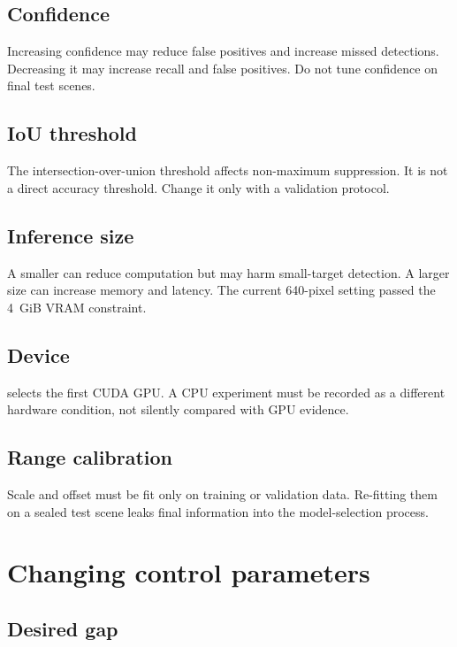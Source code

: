 \documentclass[11pt,oneside,openany]{book}
\newcommand{\file}[1]{\path{#1}}
\begin{document}
\section{Confidence}

Increasing confidence may reduce false positives and increase missed detections. Decreasing it may increase recall and false positives. Do not tune confidence on final test scenes.

\section{IoU threshold}

The intersection-over-union threshold affects non-maximum suppression. It is not a direct accuracy threshold. Change it only with a validation protocol.

\section{Inference size}

A smaller \file{image_size} can reduce computation but may harm small-target detection. A larger size can increase memory and latency. The current 640-pixel setting passed the 4~GiB VRAM constraint.

\section{Device}

\file{device: "0"} selects the first CUDA GPU. A CPU experiment must be recorded as a different hardware condition, not silently compared with GPU evidence.

\section{Range calibration}

Scale and offset must be fit only on training or validation data. Re-fitting them on a sealed test scene leaks final information into the model-selection process.

\chapter{Changing control parameters}

\section{Desired gap}
\end{document}

